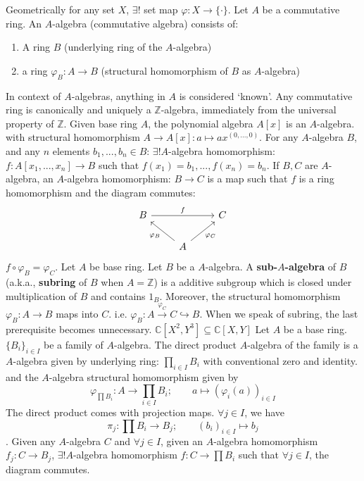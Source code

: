 \documentclass[12pt]{article}
\theoremstyle{definition}
\theoremstyle{plain}
\newcommand{\complex}{\mathbb{C}}
\newcommand{\z}{\mathbb{Z}}
\begin{document}
\Rmk Geometrically for any set $X$, $\exists !$ set map $\varphi: X\to \{\cdot\}$.
\Def Let $A$ be a commutative ring. An $A$-algebra (commutative algebra) consists of:\leavevmode
\begin{enumerate}
  \item A ring $B$ (underlying ring of the $A$-algebra)
  \item a ring $\varphi_B:A\to B$ (structural homomorphism of $B$ as $A$-algebra)
\end{enumerate}
\Rmk In context of $A$-algebras, anything in $A$ is considered `known'.
\Exe Any commutative ring is canonically and uniquely a $\z$-algebra, immediately from the universal property of $\z$.
\Exe Given base ring $A$, the polynomial algebra $A[x]$ is an $A$-algebra. with structural homomorphism $A\to A[x]: a\mapsto ax^{(0,...,0)}$.
 For any $A$-algebra $B$, and any $n$ elements $b_1,..., b_n\in B$: $\exists ! A$-algebra homomorphism: $f:A[x_1, ..., x_n]\to B$ such that $f(x_1)=b_1, ..., f(x_n)=b_n$.
\Def If $B, C$ are $A$-algebra, an $A$-algebra homomorphism: $B\to C$ is a map such that $f$ is a ring homomorphism and the diagram commutes:
\begin{equation}\begin{tikzcd}
B \arrow{rr}{f}
& &C\\
&A\arrow{lu}{\varphi_B} \arrow{ru}[swap]{\varphi_C}
\end{tikzcd}
\end{equation}
$f\circ \varphi_B=\varphi_C$.
\Def Let $A$ be base ring. Let $B$ be a $A$-algebra. A \textbf{sub-$A$-algebra} of $B$ (a.k.a., \textbf{subring} of $B$ when $A=\z$) is a additive subgroup which is closed under multiplication of $B$ and contains $1_B$. Moreover, the structural homomorphism $\varphi_B: A\to B$ maps into $C$. i.e. $\varphi_B: A\overset{\varphi_C}{\to} C \hookrightarrow B$.
\Rmk When we speak of subring, the last prerequisite becomes unnecessary.
\Exe $\complex[X^2, Y^3]\subseteq \complex[X, Y]$
\Def Let $A$ be a base ring. $\{B_i\}_{i\in I}$ be a family of $A$-algebra. The direct product $A$-algebra of the family is a $A$-algebra given by underlying ring: $\prod_{i\in I}B_i$ with conventional zero and identity. and the $A$-algebra structural homomorphism given by $$\varphi_{\prod B_i}:A\to \prod_{i\in I}B_i; \qquad a\mapsto (\varphi_{i}(a))_{i\in I}$$
\Rmk The direct product comes with projection maps. $\forall j\in I$, we have $$\pi_j:\prod B_i\to B_j; \qquad (b_i)_{i\in I}\mapsto b_j$$.
 Given any $A$-algebra $C$ and $\forall j\in I$, given an $A$-algebra homomorphism $f_j:C\to B_j$, $\exists ! A$-algebra homomorphism $f: C\to \prod B_i$  such that $\forall j\in I$, the diagram commutes.
\end{document}
